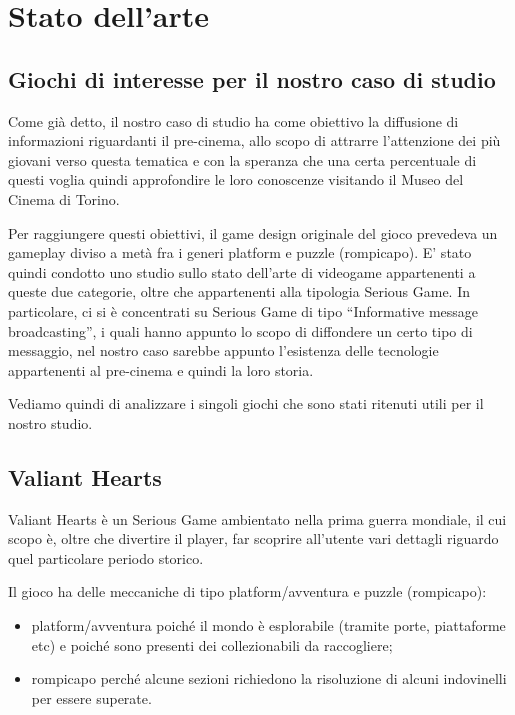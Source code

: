 \newpage


\section{Stato dell'arte}
\label{chap:stato_dell_arte}

\subsection{Giochi di interesse per il nostro caso di studio}

Come già detto, il nostro caso di studio ha come obiettivo la diffusione di informazioni riguardanti il pre-cinema, allo scopo di attrarre l'attenzione dei più giovani verso questa tematica e con la speranza che una certa percentuale di questi voglia quindi approfondire le loro conoscenze visitando il Museo del Cinema di Torino.

Per raggiungere questi obiettivi, il game design originale del gioco  prevedeva un gameplay diviso a metà fra i generi platform e puzzle (rompicapo). E' stato quindi condotto uno studio sullo stato dell'arte di videogame appartenenti a queste due categorie, oltre che appartenenti alla tipologia Serious Game. In particolare, ci si è concentrati su Serious Game di tipo ``Informative message broadcasting'', i quali hanno appunto lo scopo di diffondere un certo tipo di messaggio, nel nostro caso sarebbe appunto l'esistenza delle tecnologie appartenenti al pre-cinema e quindi la loro storia.

Vediamo quindi di analizzare i singoli giochi che sono stati ritenuti utili per il nostro studio.


\subsection{Valiant Hearts}

Valiant Hearts è un Serious Game ambientato nella prima guerra mondiale, il cui scopo è, oltre che divertire il player, far scoprire all'utente vari dettagli riguardo quel particolare periodo storico.

Il gioco ha delle meccaniche di tipo platform/avventura e puzzle (rompicapo): 

\begin{itemize}
\item platform/avventura poiché il mondo è esplorabile (tramite porte, piattaforme etc) e poiché sono presenti dei collezionabili da raccogliere; 
\item rompicapo perché alcune sezioni richiedono la risoluzione di alcuni indovinelli per essere superate.
\end{itemize}

